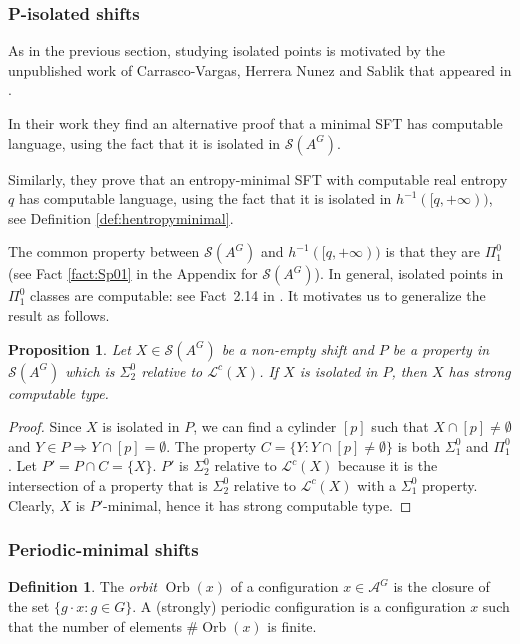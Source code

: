 \documentclass[french,american]{article}
\theoremstyle{plain}
\newtheorem{proposition}[theorem]{Proposition}
\theoremstyle{definition}
\newtheorem{definition}[theorem]{Definition}
\theoremstyle{remark}
\theoremstyle{plain}
\newcommand{\A}{\mathcal A}
\DeclareMathOperator{\Orb}{Orb}
\begin{document}
\subsubsection{P-isolated shifts}

As in the previous section, studying isolated points is motivated by the unpublished work
of Carrasco-Vargas, Herrera Nunez and Sablik that appeared in \cite{Phdnicanor2024}.

In their work they find an alternative proof that a minimal SFT has computable language,
using the fact that it is isolated in $\mathcal{S}(A^{G})$.

Similarly, they prove that an entropy-minimal SFT with computable
real entropy $q$ has computable language, using the fact that it is isolated in $h^{-1}([q,+\infty))$, see Definition \ref{def:hentropyminimal}.

The common property between $\mathcal{S}(A^{G})$ and $h^{-1}([q,+\infty))$
is that they are $\Pi_{1}^{0}$ (see Fact \ref{fact:Sp01}
in the Appendix for $\mathcal{S}(A^{G})$). In general, isolated points in $\Pi_1^0$ classes are computable: see Fact~2.14 in \cite{DOWNEY_MELNIKOV_2023}. It motivates us to generalize the result as follows.

\begin{proposition}
\label{prop:isolated} Let $X\in\mathcal{S}(A^{G})$ be a non-empty
shift and $P$ be a property in $\mathcal{S}(A^{G})$
which is $\Sigma_{2}^{0}$ relative to $\mathcal L^c(X)$.  If $X$ is isolated in $P$, then $X$ has strong computable
type.
\end{proposition}

\begin{proof}
Since $X$ is isolated in $P$, we can find a cylinder $[p]$ such that
$X \cap [p] \neq \emptyset$ and $Y\in P \Rightarrow Y\cap [p] = \emptyset$. The property $C = \{Y : Y\cap [p] \neq \emptyset\}$ is both $\Sigma_{1}^{0}$ and $\Pi_{1}^{0}$.
Let $P'=P\cap C=\{X\}$. $P'$ is $\Sigma_{2}^{0}$ relative to $\mathcal L^c(X)$ because it is the intersection of a property that is $\Sigma_{2}^{0}$ relative to $\mathcal L^c(X)$ with a $\Sigma_{1}^{0}$
property. Clearly, $X$ is $P'$-minimal, hence it has strong computable type.
\end{proof}



\subsubsection{Periodic-minimal shifts}
\begin{definition}
The \emph{orbit} $\Orb(x)$ of a configuration $x\in\A^{G}$ is the
closure of the set $\{g\cdot x:g\in G\}$. A (strongly) periodic configuration
is a configuration $x$ such that the number of elements $\#\Orb(x)$
is finite.
\end{definition}
\end{document}
